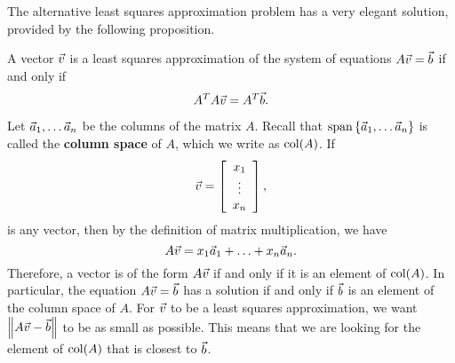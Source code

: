 \documentclass{ximera}
\begin{document}
The alternative least squares approximation problem has a very elegant solution,
provided by the following proposition.

\begin{proposition}\label{prop:least-squares-approximation}

  A vector $\vect{v}$ is a least squares approximation of the system
  of equations $A\vect{v}=\vect{b}$ if and only if
  \begin{equation*}
    A^TA\vect{v} = A^T\vect{b}.
  \end{equation*}
\end{proposition}


  Let $\vect{a}_1,\ldots\vect{a}_n$ be the columns of the matrix
  $A$. Recall that $\sspan\set{\vect{a}_1,\ldots\vect{a}_n}$ is called
  the \textbf{column space}%
   of $A$, which we write as $\col(A)$.  If
  \begin{equation*}
    \vect{v} = \startmat{c} x_1 \\ \vdots \\ x_n \stopmat,
  \end{equation*}
  is any vector, then by the definition of matrix multiplication, we
  have
  \begin{equation*}
    A\vect{v} = x_1\vect{a}_1 + \ldots + x_n\vect{a}_n.
  \end{equation*}
  Therefore, a vector is of the form $A\vect{v}$ if and only if it is
  an element of $\col(A)$. In particular, the equation
  $A\vect{v}=\vect{b}$ has a solution if and only if $\vect{b}$ is an
  element of the column space of $A$. For $\vect{v}$ to be a least
  squares approximation, we want $\norm{A\vect{v}-\vect{b}}$ to be as
  small as possible. This means that we are looking for the element of
  $\col(A)$ that is closest to $\vect{b}$.
  \begin{center}
  \end{center}
\end{document}
